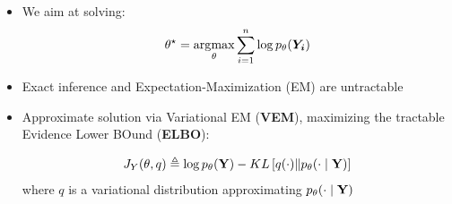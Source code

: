 \documentclass{beamer}
\theoremstyle{remark}
\DeclareMathOperator*{\argmax}{\arg\!\max}
\begin{document}
\begin{frame}
    \begin{itemize}
        \item We aim at solving:
\vspace{-0.6cm}
    \begin{equation*}  \label{MLEequation}
    \mathversion{bold}
 \theta^{\star} = \argmax _{\theta} \sum _{i =1} ^n \operatorname{log} p_{\theta}(\boldsymbol{Y_i})\end{equation*}
    \item Exact inference and Expectation-Maximization (EM) are untractable
    \item Approximate solution via Variational EM (\textbf{VEM}), maximizing the tractable Evidence Lower BOund (\textbf{ELBO}):

     \begin{equation*}
     J_Y(\theta, q) \triangleq \log p_{\theta}(\boldsymbol{\mathbf{Y}})-K L\left[q(\cdot) \|  p_{\theta}(\cdot \mid   \boldsymbol{\mathbf{Y}})\right]
\end{equation*}
where $q$ is a variational distribution approximating $p_{\theta}(\cdot \mid \boldsymbol{\mathbf{Y}})$
\end{itemize}
\end{frame}
\end{document}

